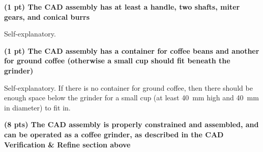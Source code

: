 \documentclass[11pt]{article}
\begin{document}
\MakeHandoutHeader


\textbf{(1 pt) The CAD assembly has at least a handle, two shafts, miter gears, and conical burrs}

Self-explanatory.

\textbf{(1 pt) The CAD assembly has a container for coffee beans and another for ground coffee (otherwise a small cup should fit beneath the grinder)}

Self-explanatory. If there is no container for ground coffee, then there should be enough space below the grinder for a small cup (at least 40~mm high and 40~mm in diameter) to fit in. 

\textbf{(8 pts) The CAD assembly is properly constrained and assembled, and can be operated as a coffee grinder, as described in the CAD Verification \& Refine section above}
\end{document}
